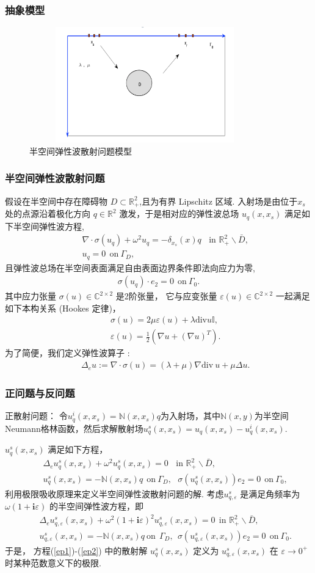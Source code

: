 \documentclass[8pt]{beamer}
\newcommand{\R}{\mathbb{R}}
\renewcommand{\i}{\mathbf{i}}
\newcommand{\om}{\omega}
\newcommand{\ep}{\varepsilon}
\newcommand{\na}{\nabla}
\newcommand{\Ga}{\Gamma}
\newcommand{\bks}{\backslash}
\renewcommand{\i}{\mathbf{i}}
\renewcommand{\C}{{\mathbb{C}}}
\renewcommand{\div}{\mathrm{div}}
\newcommand{\N}{\mathbb{N}}
\newcommand{\be}{\begin{eqnarray}}
\newcommand{\ee}{\end{eqnarray}}
\newcommand{\ben}{\begin{eqnarray*}}
\newcommand{\een}{\end{eqnarray*}}
\begin{document}
\begin{frame}
\frametitle{抽象模型}
\begin{figure}
	\centering
	\includegraphics[width=10cm,height=5cm]{./figure/half_forward}
	\caption{半空间弹性波散射问题模型}
\end{figure}
\end{frame}

\begin{frame}
\frametitle{半空间弹性波散射问题}
假设在半空间中存在障碍物 $D\subset\R^2_+$,且为有界 Lipschitz 区域. 入射场是由位于$x_s$ 处的点源沿着极化方向 $q\in \R^2$ 激发，于是相对应的弹性波总场 $u_q(x,x_s)$ 满足如下半空间弹性波方程,
\ben\label{elastic_eq}
& &\nabla\cdot\sigma(u_q) + \omega^2u_q= -\delta_{x_s}(x)q \ \ \ \ \mbox{in }\R_+^2\bks \bar{D},\\
& &u_q=0 \ \ \mbox{on} \ \Ga_D  ,
\een
且弹性波总场在半空间表面满足自由表面边界条件即法向应力为零,
\ben
\sigma(u_q)\cdot e_2=0 \ \ \mbox{on} \ \Ga_0.
\een
其中应力张量 $\sigma(u)\in \C^{2\times2}$ 是2阶张量， 它与应变张量 $\ep(u)\in \C^{2\times2}$ 一起满足如下本构关系 (Hookes 定律)，
\ben
& &\sigma(u) = 2\mu\ep(u) + \lambda\div u \mathbb{I}, \\
& &\ep(u)=\frac{1}{2}(\na u +(\na u)^T).
\een
为了简便，我们定义弹性波算子 :
\ben
& &\Delta_e u:=\nabla\cdot\sigma(u)=(\lambda+\mu)\nabla\div \ u+\mu\Delta u.
\een
\end{frame}

\begin{frame}
\frametitle{正问题与反问题}
	\begin{block}{正散射问题：}
		令$u^i_q(x,x_s)=\N(x,x_s)q$为入射场，其中$\N(x,y)$为半空间Neumann格林函数，然后求解散射场$u^s_q(x,x_s)=u_q(x,x_s)-u^i_q(x,x_s)$.
	\end{block}
\pause
$u_q^s(x,x_s)$ 满足如下方程，
\be
& &\Delta_e u_q^s(x,x_s)+ \omega^2u_q^s(x,x_s)= 0 \ \ \ \ \mbox{in }\R_+^2\bks \bar{D},\label{ep1}\\
& &u^s_q(x,x_s)=-\N(x,x_s)q \ \ \mbox{on} \ \Ga_D,\ \ \ \sigma(u_q^s(x,x_s))e_2=0 \ \ \mbox{on} \ \Ga_0,\label{ep2}
\ee
\pause
利用极限吸收原理来定义半空间弹性波散射问题的解.  考虑$u^s_{q,\ep}$ 是满足角频率为 $\om(1+\i\ep)$ 的半空间弹性波方程，即
\ben
& &\Delta_e u_{q,\ep}^s(x,x_s)+ \omega^2(1+\i\ep)^2 u_{q,\ep}^s(x,x_s)= 0 \ \  \mbox{in }\R_+^2\bks \bar{D},\label{p12}\\
& &u^s_{q,\ep}(x,x_s)=-\N(x,x_s)q \  \mbox{on} \ \  \Ga_D,\ \ \sigma(u_{q,\ep}^s(x,x_s))e_2=0 \ \  \mbox{on} \  \Ga_0 .\label{p22}
\een
于是， 方程(\ref{ep1})-(\ref{ep2}) 中的散射解 $u_q^s(x,x_s)$ 定义为 $u_{q,\ep}^s(x,x_s)$ 在 $\ep\to 0^+$ 时某种范数意义下的极限.
\end{frame}
\end{document}
